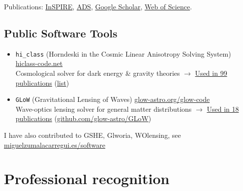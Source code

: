 \documentclass[11pt,a4paper]{article}
\newcommand{\mzc}[1]{}
\begin{document}
\vspace{.5cm}
Publications: %
\href{https://inspirehep.net/search?p=author\%3AM.Zumalacarregui.1}{InSPIRE},
\href{http://adsabs.harvard.edu/cgi-bin/basic_connect?qsearch=miguel+zumalacarregui&version=1}{ADS}, 
\href{https://scholar.google.com/citations?user=Zsvsq0MAAAAJ&hl=en}{Google Scholar},
\href{https://www.webofscience.com/wos/woscc/summary/c4236c65-f24f-4c7f-bba1-97eb6a071a0a-fc37ee8a/relevance/1}{Web of Science}.

\mzc{update plot}


\subsection*{Public Software Tools}
\begin{itemize}
\item \texttt{hi\_class} (Horndeski in the Cosmic Linear Anisotropy Solving System) \quad  \href{https://hiclass-code.net}{hiclass-code.net} \\ Cosmological solver for dark energy \& gravity theories 
\quad $\longrightarrow$ \underline{Used in 99 publications} (\href{https://hiclass-code.net/#pubs}{list})
\item \texttt{GLoW} (Gravitational Lensing of Waves)  \quad \href{https://glow-astro.org/glow-code.html}{glow-astro.org/glow-code} \\ Wave-optics lensing solver for general matter distributions \quad $\longrightarrow$  \underline{Used in 18 publications} (\href{https://github.com/glow-astro/GLoW}{github.com/glow-astro/GLoW})
\end{itemize}
\vspace{-5pt}
I have also contributed to GSHE, Glworia, WOlensing, see \href{https://miguelzumalacarregui.es/software.html}{miguelzumalacarregui.es/software}

\mzc{add Glworia, WOlensing, GSHE, companion papers}


\section*{Professional recognition}
\end{document}
